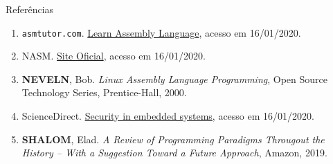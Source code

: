 \begin{frame}[fragile]{Referências}

    \begin{enumerate}
        \item \texttt{asmtutor.com}. \href{https://asmtutor.com/#lesson1}{Learn Assembly Language},
            acesso em 16/01/2020.
  
        \item NASM. \href{https://www.nasm.us/}{Site Oficial}, acesso em 16/01/2020.
 
        \item \textbf{NEVELN}, Bob. \textit{Linux Assembly Language Programming}, Open Source
            Technology Series, Prentice-Hall, 2000.

        \item ScienceDirect. \href{https://www.sciencedirect.com/topics/computer-science/von-neumann-architecture}{Security in embedded systems}, acesso em 16/01/2020.
 
        \item \textbf{SHALOM}, Elad. \textit{A Review of Programming Paradigms Througout the 
            History -- With a Suggestion Toward a Future Approach}, Amazon, 2019.

    \end{enumerate}

\end{frame}
